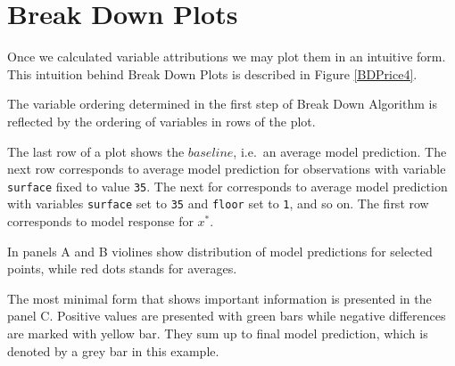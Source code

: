 \documentclass[]{book}
\theoremstyle{definition}
\theoremstyle{definition}
\theoremstyle{definition}
\theoremstyle{remark}
\begin{document}
\hypertarget{break-down-plots}{%
\section{Break Down Plots}\label{break-down-plots}}

Once we calculated variable attributions we may plot them in an
intuitive form. This intuition behind Break Down Plots is described in
Figure \ref{BDPrice4}.

The variable ordering determined in the first step of Break Down
Algorithm is reflected by the ordering of variables in rows of the plot.

The last row of a plot shows the \(baseline\), i.e.~an average model
prediction. The next row corresponds to average model prediction for
observations with variable \texttt{surface} fixed to value \texttt{35}.
The next for corresponds to average model prediction with variables
\texttt{surface} set to \texttt{35} and \texttt{floor} set to
\texttt{1}, and so on. The first row corresponds to model response for
\(x^*\).

In panels A and B violines show distribution of model predictions for
selected points, while red dots stands for averages.

The most minimal form that shows important information is presented in
the panel C. Positive values are presented with green bars while
negative differences are marked with yellow bar. They sum up to final
model prediction, which is denoted by a grey bar in this example.
\end{document}
